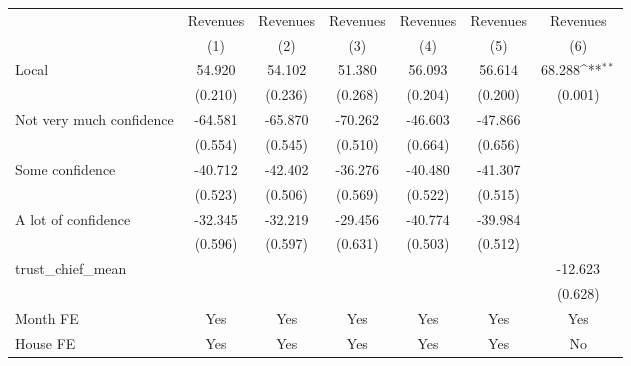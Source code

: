 {
\def\sym#1{\ifmmode^{#1}\else\(^{#1}\)\fi}
\begin{tabular}{l*{6}{c}}
\toprule
                &\multicolumn{1}{c}{Revenues}&\multicolumn{1}{c}{Revenues}&\multicolumn{1}{c}{Revenues}&\multicolumn{1}{c}{Revenues}&\multicolumn{1}{c}{Revenues}&\multicolumn{1}{c}{Revenues}\\
                &\multicolumn{1}{c}{(1)}         &\multicolumn{1}{c}{(2)}         &\multicolumn{1}{c}{(3)}         &\multicolumn{1}{c}{(4)}         &\multicolumn{1}{c}{(5)}         &\multicolumn{1}{c}{(6)}         \\
\midrule
Local           &   54.920         &   54.102         &   51.380         &   56.093         &   56.614         &   68.288\sym{**} \\
                &  (0.210)         &  (0.236)         &  (0.268)         &  (0.204)         &  (0.200)         &  (0.001)         \\
Not very much confidence&  -64.581         &  -65.870         &  -70.262         &  -46.603         &  -47.866         &                  \\
                &  (0.554)         &  (0.545)         &  (0.510)         &  (0.664)         &  (0.656)         &                  \\
Some confidence &  -40.712         &  -42.402         &  -36.276         &  -40.480         &  -41.307         &                  \\
                &  (0.523)         &  (0.506)         &  (0.569)         &  (0.522)         &  (0.515)         &                  \\
A lot of confidence&  -32.345         &  -32.219         &  -29.456         &  -40.774         &  -39.984         &                  \\
                &  (0.596)         &  (0.597)         &  (0.631)         &  (0.503)         &  (0.512)         &                  \\
trust\_chief\_mean&                  &                  &                  &                  &                  &  -12.623         \\
                &                  &                  &                  &                  &                  &  (0.628)         \\
Month FE        &      Yes         &      Yes         &      Yes         &      Yes         &      Yes         &      Yes         \\
House FE        &      Yes         &      Yes         &      Yes         &      Yes         &      Yes         &       No         \\

\end{tabular}}
